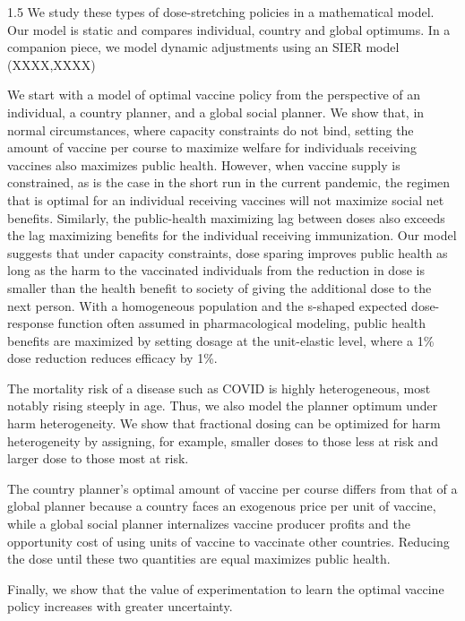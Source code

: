 \documentclass[12pt]{article}
\begin{document}
\begin{spacing}{1.5}
We study these types of dose-stretching policies in a mathematical model. Our model is static and compares  individual, country and global optimums. In a companion piece, we model dynamic adjustments using an SIER model (XXXX,XXXX)

We start with a model of optimal vaccine policy from the perspective of an individual, a country planner, and a global social planner. We show that, in normal circumstances, where capacity constraints do not bind, setting the amount of vaccine per course to maximize welfare for individuals receiving vaccines also maximizes public health. However, when vaccine supply is constrained, as is the case in the short run in the current pandemic, the regimen that is optimal for an individual receiving vaccines will not maximize social net benefits. Similarly, the public-health maximizing lag between doses also exceeds the lag maximizing benefits for the individual receiving immunization. Our model suggests that under capacity constraints, dose sparing improves public health as long as the harm to the vaccinated individuals from the reduction in dose is smaller than the health benefit to society of giving the additional dose to the next person. With a homogeneous population and the s-shaped expected dose-response function often assumed in pharmacological modeling, public health benefits are maximized by setting dosage at the unit-elastic level, where a 1\% dose reduction reduces efficacy by 1\%. 

The mortality risk of a disease such as COVID is highly heterogeneous, most notably rising steeply in age. Thus, we also model the planner optimum under harm heterogeneity. We show that fractional dosing can be optimized for harm heterogeneity by assigning, for example, smaller doses to those less at risk and larger dose to those most at risk. 

The country planner's optimal amount of vaccine per course differs from that of a global planner because a country faces an exogenous price per unit of vaccine, while a global social planner internalizes vaccine producer profits and the opportunity cost of using units of vaccine to vaccinate other countries. Reducing the dose until these two quantities are equal maximizes public health.

Finally, we show that the value of experimentation to learn the optimal vaccine policy increases with greater uncertainty. 







\end{spacing}
\end{document}
